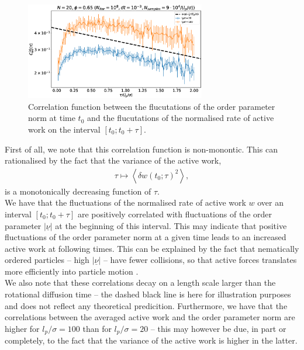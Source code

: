 \documentclass[10pt]{article}
\begin{document}
\begin{figure}[H]
\centering
\includegraphics[width=0.7\textwidth]{corWorkOrderAve_Nm2000_Dk6500_Em1000.eps}
\caption{Correlation function between the flucutations of the order parameter norm at time $t_0$ and the flucutations of the normalised rate of active work on the interval $[t_0; t_0 + \tau]$.}
\label{Cawo}
\end{figure}

First of all, we note that this correlation function is non-monontic. This can rationalised by the fact that the variance of the active work,
\begin{align*}
\tau \mapsto \left<\delta w(t_0; \tau)^2\right>,
\end{align*}
is a monotonically decreasing function of $\tau$.\\

We have that the fluctuations of the normalised rate of active work $w$ over an interval $[t_0; t_0 + \tau]$ are positively correlated with fluctuations of the order parameter $|\underline{\nu}|$ at the beginning of this interval. This may indicate that positive fluctuations of the order parameter norm at a given time leads to an increased active work at following times. This can be explained by the fact that nematically ordered particles -- \ie high $|\underline{\nu}|$ -- have fewer collisions, so that active forces translates more efficiently into particle motion \cite{nemoto_optimizing_2019}.\\

We also note that these correlations decay on a length scale larger than the rotational diffusion time -- the dashed black line is here for illustration purposes and does not reflect any theoretical predicition. Furthermore, we have that the correlations between the averaged active work and the order parameter norm are higher for $l_p/\sigma=100$ than for $l_p/\sigma = 20$ -- this may however be due, in part or completely, to the fact that the variance of the active work is higher in the latter.\\
\end{document}
